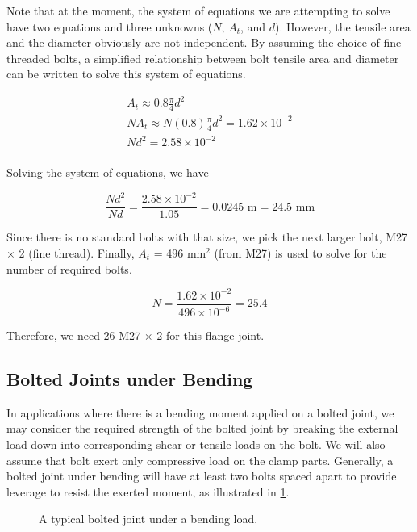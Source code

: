 \documentclass[
10pt,
a4paper,
openany,
svgnames,
]{book}
\begin{document}
\begin{solution}
Note that at the moment, the system of equations we are attempting to solve have two equations and three unknowns ($N$, $A_t$, and $d$). However, the tensile area and the diameter obviously are not independent. By assuming the choice of fine-threaded bolts, a simplified relationship between bolt tensile area and diameter can be written to solve this system of equations.

\[\begin{gathered}
  A_t \approx 0.8\frac{\pi }{4}d^2 \\ 
  NA_t \approx N(0.8)\frac{\pi}{4}d^2 = 1.62 \times 10^{-2} \\ 
  Nd^2 = 2.58 \times 10^{-2} \\ 
\end{gathered} \]

Solving the system of equations, we have

\[\frac{Nd^2}{Nd} = \frac{2.58 \times 10^{-2}}{1.05} = 0.0245 \text{ m} = 24.5 \text{ mm} \]

Since there is no standard bolts with that size, we pick the next larger bolt, M27 $\times$ 2 (fine thread). Finally, $A_t$ = 496 mm$^2$ (from M27) is used to solve for the number of required bolts.

\[N = \frac{1.62 \times 10^{-2}}{496 \times 10^{-6}} = 25.4\]

Therefore, we need 26 M27 $\times$ 2 for this flange joint.
\end{solution}

\subsection{Bolted Joints under Bending}

In applications where there is a bending moment applied on a bolted joint, we may consider the required strength of the bolted joint by breaking the external load down into corresponding shear or tensile loads on the bolt. We will also assume that bolt exert only compressive load on the clamp parts. Generally, a bolted joint under bending will have at least two bolts spaced apart to provide leverage to resist the exerted moment, as illustrated in \cref{fig: bolted joint under bending}.

\begin{figure}[h]
  \centering
  \caption{A typical bolted joint under a bending load.}
  \label{fig: bolted joint under bending}
\end{figure}
\end{document}
